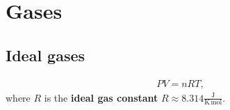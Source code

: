 \section{Gases}
\subsection{Ideal gases}

    \begin{theorem}
        \begin{gather}
            \label{thermo:ideal_gas_law}
            PV = nRT,
        \end{gather}
        where $R$ is the \textbf{ideal gas constant} $R\approx8.314 \frac{\mathrm{J}}{\mathrm{K\,mol}}$.
    \end{theorem}